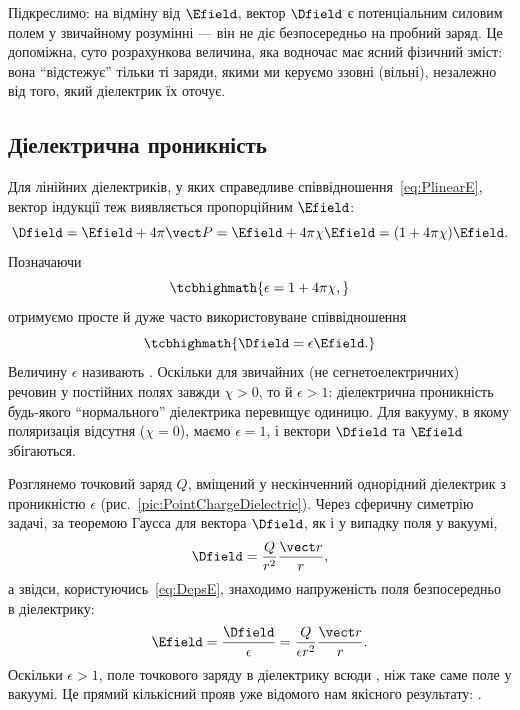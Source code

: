 Підкреслимо: на відміну від $\Efield$, вектор $\Dfield$  є потенціальним силовим полем у звичайному розумінні --- він не діє безпосередньо
на пробний заряд. Це допоміжна, суто розрахункова величина, яка водночас має ясний фізичний зміст: вона \enquote{відстежує} тільки ті заряди, якими ми
керуємо ззовні (вільні), незалежно від того, який діелектрик їх оточує.

\subsection*{Діелектрична проникність}

Для лінійних діелектриків, у яких справедливе співвідношення~\eqref{eq:PlinearE}, вектор індукції теж виявляється пропорційним $\Efield$:
\begin{equation*}
	\Dfield = \Efield + 4\pi\vect P = \Efield + 4\pi\chi\Efield = (1+4\pi\chi)\Efield.
\end{equation*}
Позначаючи
\begin{equation}\label{eq:eps}
	\tcbhighmath{
		\epsilon = 1 + 4\pi\chi,
	}
\end{equation}
отримуємо просте й дуже часто використовуване співвідношення
\begin{equation}\label{eq:DepsE}
	\tcbhighmath{
		\Dfield = \epsilon\Efield.
	}
\end{equation}
Величину $\epsilon$ називають . Оскільки для звичайних (не сегнетоелектричних) речовин у постійних полях
завжди $\chi > 0$, то й $\epsilon > 1$: діелектрична проникність будь-якого \enquote{нормального} діелектрика перевищує одиницю. Для вакууму, в якому
поляризація відсутня ($\chi = 0$), маємо $\epsilon = 1$, і вектори $\Dfield$ та $\Efield$ збігаються.

 Розглянемо точковий заряд $Q$, вміщений у нескінченний однорідний діелектрик з проникністю $\epsilon$ (рис.~\ref{pic:PointChargeDielectric}). Через сферичну симетрію
задачі, за теоремою Гаусса для вектора $\Dfield$, як і у випадку поля у вакуумі,
\begin{equation*}
	\Dfield = \frac{Q}{r^2}\frac{\vect r}{r},
\end{equation*}
а звідси, користуючись~\eqref{eq:DepsE}, знаходимо напруженість поля безпосередньо в діелектрику:
\begin{equation*}
	\Efield = \frac{\Dfield}{\epsilon} = \frac{Q}{\epsilon r^2}\frac{\vect r}{r}.
\end{equation*}
Оскільки $\epsilon > 1$, поле точкового заряду в діелектрику всюди , ніж таке саме поле у вакуумі. Це прямий кількісний прояв уже
відомого нам якісного результату: .

